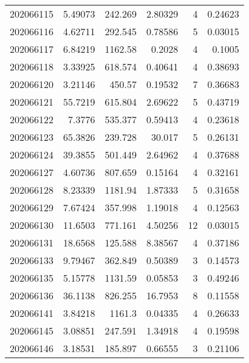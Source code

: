 \begin{tabular}{rrrrrr}
 202066115 &          5.49073 &      242.269  &            2.80329 &           4 & 0.24623 \\
 202066116 &          4.62711 &      292.545  &            0.78586 &           5 & 0.03015 \\
 202066117 &          6.84219 &     1162.58   &            0.2028  &           4 & 0.1005  \\
 202066118 &          3.33925 &      618.574  &            0.40641 &           4 & 0.38693 \\
 202066120 &          3.21146 &      450.57   &            0.19532 &           7 & 0.36683 \\
 202066121 &         55.7219  &      615.804  &            2.69622 &           5 & 0.43719 \\
 202066122 &          7.3776  &      535.377  &            0.59413 &           4 & 0.23618 \\
 202066123 &         65.3826  &      239.728  &           30.017   &           5 & 0.26131 \\
 202066124 &         39.3855  &      501.449  &            2.64962 &           4 & 0.37688 \\
 202066127 &          4.60736 &      807.659  &            0.15164 &           4 & 0.32161 \\
 202066128 &          8.23339 &     1181.94   &            1.87333 &           5 & 0.31658 \\
 202066129 &          7.67424 &      357.998  &            1.19018 &           4 & 0.12563 \\
 202066130 &         11.6503  &      771.161  &            4.50256 &          12 & 0.03015 \\
 202066131 &         18.6568  &      125.588  &            8.38567 &           4 & 0.37186 \\
 202066133 &          9.79467 &      362.849  &            0.50389 &           3 & 0.14573 \\
 202066135 &          5.15778 &     1131.59   &            0.05853 &           3 & 0.49246 \\
 202066136 &         36.1138  &      826.255  &           16.7953  &           8 & 0.11558 \\
 202066141 &          3.84218 &     1161.3    &            0.04335 &           4 & 0.26633 \\
 202066145 &          3.08851 &      247.591  &            1.34918 &           4 & 0.19598 \\
 202066146 &          3.18531 &      185.897  &            0.66555 &           3 & 0.21106 \\

\end{tabular}
